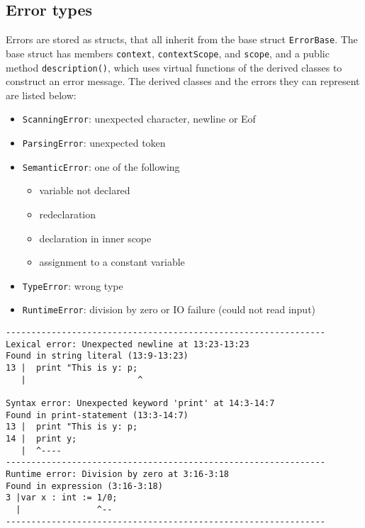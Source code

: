 \documentclass[a4paper]{article}
\newcommand*{\code}[1]{\texttt{#1}}
\begin{document}
\subsection{Error types}

Errors are stored as structs, that all inherit from the 
base struct \code{ErrorBase}. The base struct has members 
\code{context}, \code{contextScope}, and \code{scope}, 
and a public method \code{description()}, which uses 
virtual functions of the derived classes to construct an 
error message. The derived classes and the errors they 
can represent are listed below:
\begin{itemize}
  \item \code{ScanningError}: unexpected character, newline or Eof
  \item \code{ParsingError}: unexpected token
  \item \code{SemanticError}: one of the following
  \begin{itemize}
    \item variable not declared
    \item redeclaration
    \item declaration in inner scope
    \item assignment to a constant variable
  \end{itemize}
  \item \code{TypeError}: wrong type
  \item \code{RuntimeError}: division by zero or IO failure (could not read input)
\end{itemize}

\begin{verbatim}
---------------------------------------------------------------
Lexical error: Unexpected newline at 13:23-13:23
Found in string literal (13:9-13:23)
13 |  print "This is y: p;
   |                      ^

Syntax error: Unexpected keyword 'print' at 14:3-14:7
Found in print-statement (13:3-14:7)
13 |  print "This is y: p;
14 |  print y; 
   |  ^----        
---------------------------------------------------------------
Runtime error: Division by zero at 3:16-3:18
Found in expression (3:16-3:18)
3 |var x : int := 1/0;
  |               ^--
---------------------------------------------------------------
\end{verbatim}
\end{document}
